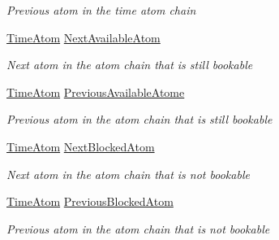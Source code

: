 \begin{DoxyCompactItemize}
\begin{DoxyCompactList}\small\item\em Previous atom in the time atom chain \end{DoxyCompactList}\item 
\hyperlink{class_general_health_care_elements_1_1_booking_models_1_1_time_atom}{Time\+Atom} \hyperlink{class_general_health_care_elements_1_1_booking_models_1_1_time_atom_a5ca638d096d45660151fbb950ab6f3f6}{Next\+Available\+Atom}
\begin{DoxyCompactList}\small\item\em Next atom in the atom chain that is still bookable \end{DoxyCompactList}\item 
\hyperlink{class_general_health_care_elements_1_1_booking_models_1_1_time_atom}{Time\+Atom} \hyperlink{class_general_health_care_elements_1_1_booking_models_1_1_time_atom_a228a59de468a468681349c0acf0dc1b3}{Previous\+Available\+Atome}
\begin{DoxyCompactList}\small\item\em Previous atom in the atom chain that is still bookable \end{DoxyCompactList}\item 
\hyperlink{class_general_health_care_elements_1_1_booking_models_1_1_time_atom}{Time\+Atom} \hyperlink{class_general_health_care_elements_1_1_booking_models_1_1_time_atom_ad15044a1ef9707201d76dbc1d988932f}{Next\+Blocked\+Atom}
\begin{DoxyCompactList}\small\item\em Next atom in the atom chain that is not bookable \end{DoxyCompactList}\item 
\hyperlink{class_general_health_care_elements_1_1_booking_models_1_1_time_atom}{Time\+Atom} \hyperlink{class_general_health_care_elements_1_1_booking_models_1_1_time_atom_aafaad6f374eb4208c54fd12b3f135429}{Previous\+Blocked\+Atom}
\begin{DoxyCompactList}\small\item\em Previous atom in the atom chain that is not bookable \end{DoxyCompactList}\item 

\end{DoxyCompactItemize}
